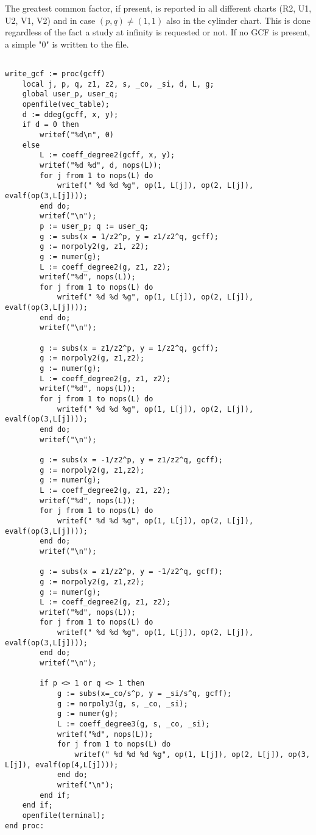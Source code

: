 \documentclass[a4paper,10pt]{article}
\begin{document}
The greatest common factor, if present, is reported in all different charts (R2, U1, U2, V1, V2) and in case $(p,q)\not=(1,1)$ also in the cylinder chart.  This is done regardless of the fact a study at infinity is requested or not.  If no GCF is present, a simple "0"  is written to the file.

\begin{lstlisting}[name=writelog]

write_gcf := proc(gcff)
    local j, p, q, z1, z2, s, _co, _si, d, L, g;
    global user_p, user_q;
    openfile(vec_table);
    d := ddeg(gcff, x, y);
    if d = 0 then
        writef("%d\n", 0)
    else
        L := coeff_degree2(gcff, x, y);
        writef("%d %d", d, nops(L));
        for j from 1 to nops(L) do
            writef(" %d %d %g", op(1, L[j]), op(2, L[j]), evalf(op(3,L[j])));
        end do;
        writef("\n");
        p := user_p; q := user_q;
        g := subs(x = 1/z2^p, y = z1/z2^q, gcff);
        g := norpoly2(g, z1, z2);
        g := numer(g);
        L := coeff_degree2(g, z1, z2);
        writef("%d", nops(L));
        for j from 1 to nops(L) do
            writef(" %d %d %g", op(1, L[j]), op(2, L[j]), evalf(op(3,L[j])));
        end do;
        writef("\n");

        g := subs(x = z1/z2^p, y = 1/z2^q, gcff);
        g := norpoly2(g, z1,z2);
        g := numer(g);
        L := coeff_degree2(g, z1, z2);
        writef("%d", nops(L));
        for j from 1 to nops(L) do
            writef(" %d %d %g", op(1, L[j]), op(2, L[j]), evalf(op(3,L[j])));
        end do;
        writef("\n");

        g := subs(x = -1/z2^p, y = z1/z2^q, gcff);
        g := norpoly2(g, z1,z2);
        g := numer(g);
        L := coeff_degree2(g, z1, z2);
        writef("%d", nops(L));
        for j from 1 to nops(L) do
            writef(" %d %d %g", op(1, L[j]), op(2, L[j]), evalf(op(3,L[j])));
        end do;
        writef("\n");

        g := subs(x = z1/z2^p, y = -1/z2^q, gcff);
        g := norpoly2(g, z1,z2);
        g := numer(g);
        L := coeff_degree2(g, z1, z2);
        writef("%d", nops(L));
        for j from 1 to nops(L) do
            writef(" %d %d %g", op(1, L[j]), op(2, L[j]), evalf(op(3,L[j])));
        end do;
        writef("\n");

        if p <> 1 or q <> 1 then
            g := subs(x=_co/s^p, y = _si/s^q, gcff);
            g := norpoly3(g, s, _co, _si);
            g := numer(g);
            L := coeff_degree3(g, s, _co, _si);
            writef("%d", nops(L));
            for j from 1 to nops(L) do
                writef(" %d %d %d %g", op(1, L[j]), op(2, L[j]), op(3, L[j]), evalf(op(4,L[j])));
            end do;
            writef("\n");
        end if;
    end if;
    openfile(terminal);
end proc:
\end{lstlisting}
\end{document}
